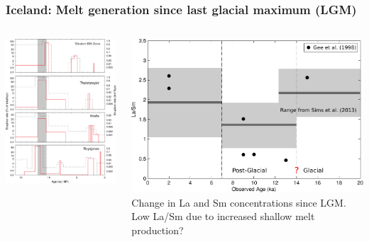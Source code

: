\documentclass[aspectratio=169]{beamer}
\begin{document}
\begin{frame}
    \frametitle{Iceland: Melt generation since last glacial maximum (LGM)}
    \begin{columns}
        \begin{column}{0.4\textwidth}
            \includegraphics[height=.8\paperheight]{./figures/iceland-volumes.pdf}
        \end{column}
        \begin{column}{0.6\textwidth}
            \includegraphics[height=.5\paperheight]{./figures/iceland-chemistry.pdf}
            Change in La and Sm concentrations since LGM. Low La/Sm due to increased shallow melt production?
        \end{column}
    \end{columns}
\end{frame}
\end{document}
